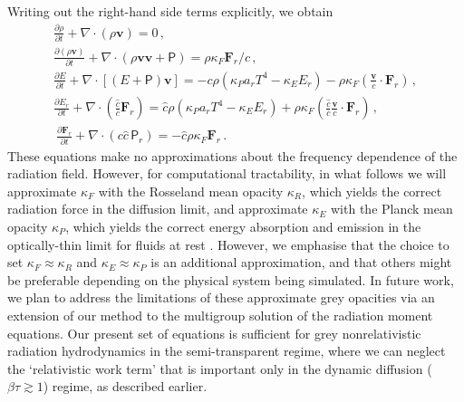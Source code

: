 \documentclass[fleqn,usenatbib]{mnras}
\newcommand{\vc}[1]{{\mathbf{#1}}}
\begin{document}
Writing out the right-hand side terms explicitly, we obtain
\begin{align}
    \label{eq:hydro_continuity}
    \frac{\partial \rho}{\partial t} + \nabla \cdot (\rho \vc{v}) = 0 \, , \\
    \label{eq:hydro_momentum}
    \frac{\partial (\rho \vc{v})}{\partial t} + \nabla \cdot (\rho \vc{v} \vc{v} + \mathsf{P}) = \rho \kappa_F {\vc{F}_r / c} \, , \\
    \label{eq:hydro_energy}
    \frac{\partial E}{\partial t} + \nabla \cdot \left[(E + \mathsf{P})\vc{v}\right] = -c \rho (\kappa_P a_r T^4 - \kappa_E E_r) - \rho \kappa_F \left( \frac{\vc{v}}{c} \cdot \vc{F}_r \right) \, , \\
    \label{eq:rad_energy}
    \frac{\partial E_r}{\partial t} + \nabla \cdot \left( \frac{\hat c}{c} \vc{F}_r \right) = \hat c \rho \left(\kappa_P a_r T^4 - \kappa_E E_r \right) + \rho \kappa_F \left( \frac{\hat c}{c} \frac{\vc{v}}{c} \cdot \vc{F}_r \right) \, , \\\
    \label{eq:rad_flux}
    \frac{\partial \vc{F}_r}{\partial t} + \nabla \cdot (c \hat c \, \mathsf{P}_r) = -\hat c \rho \kappa_F \vc{F}_r \, .
\end{align}
These equations make no approximations about the frequency dependence of the radiation field. However, for computational tractability, in what follows we will approximate $\kappa_F$ with the Rosseland mean opacity $\kappa_R$, which yields the correct radiation force in the diffusion limit, and approximate $\kappa_E$ with the Planck mean opacity $\kappa_P$, which yields the correct energy absorption and emission in the optically-thin limit for fluids at rest \citep{Mihalas_1984}. However, we emphasise that the choice to set $\kappa_F \approx \kappa_R$ and $\kappa_E \approx \kappa_P$ is an additional approximation, and that others might be preferable depending on the physical system being simulated.  In future work, we plan to address the limitations of these approximate grey opacities via an extension of our method to the multigroup solution of the radiation moment equations.  Our present set of equations is sufficient for grey nonrelativistic radiation hydrodynamics in the semi-transparent regime, where we can neglect the `relativistic work term' that is important only in the dynamic diffusion ($\beta \tau \gtrsim 1$) regime, as described earlier.
\end{document}
